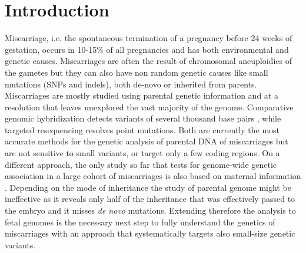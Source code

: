 
\section*{Introduction}

Miscarriage, i.e. the spontaneous termination of a pregnancy before 24 weeks of gestation, occurs in  10-15\% of all pregnancies \cite{larsen2013new,ammon2012systematic, andersen2000maternal} and has both environmental and genetic causes\cite{larsen2013new}. Miscarriages are often the result of chromosomal aneuploidies of the gametes but they can also have non random genetic causes like small mutations (SNPs and indels), both de-novo or inherited from parents. Miscarriages are mostly studied using parental genetic information \cite{pereza2017systematic} and at a resolution that leaves unexplored the vast majority of the genome. Comparative genomic hybridization detects variants of several thousand base pairs \cite{robberecht2009diagnosis, kudesia2014rescue,mathur2014miscarriage}, while targeted resequencing resolves point mutations. Both are currently the most accurate methods for the genetic analysis of parental DNA of miscarriages but are not sensitive to small variants, or target only a few coding regions. On a different approach, the only study so far that tests for genome-wide genetic association in a large cohort of miscarriages is also based on maternal information \cite{laisk2020genetic}. Depending on the mode of inheritance the study of parental genome might be ineffective as it reveals only half of the inheritance that was effectively passed to the embryo and it misses \textit{de novo} mutations. Extending therefore the analysis to fetal genomes is the necessary next step to fully understand the genetics of miscarriages with an approach that systematically targets also small-size genetic variants. 

